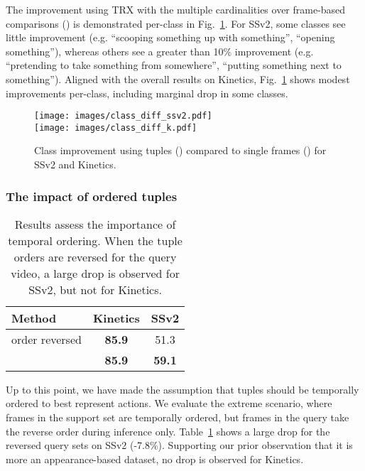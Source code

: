 \documentclass[final]{cvpr}
\begin{document}
The improvement using TRX with the multiple cardinalities  over frame-based comparisons () is demonstrated per-class in Fig.~\ref{fig:class_improvement_ss}.
For SSv2, some classes see little improvement (e.g. ``scooping something up with something'', ``opening something''), whereas others see a greater than 10\% improvement (e.g. ``pretending to take something from somewhere'', ``putting something next to something''). Aligned with the overall results on Kinetics, Fig.~\ref{fig:class_improvement_ss} shows modest improvements per-class, including marginal drop in some classes.


\begin{figure}[t]
\centering
\texttt{[image: images/class\_diff\_ssv2.pdf]}\\
\vspace{-2mm}
\texttt{[image: images/class\_diff\_k.pdf]}
\caption{Class improvement using tuples () compared to single frames () for SSv2 and Kinetics.\vspace{-8pt}}
\label{fig:class_improvement_ss}
\end{figure}


\vspace*{-8pt}
\subsubsection{The impact of ordered tuples}\label{sec:ablation_order}
\vspace*{-5pt}

\begin{table}
\small
\centering 
\begin{tabular}{lcc}
\toprule
Method                                            &   Kinetics    &   SSv2 \\ \midrule
 order reversed           &   {\bf 85.9}        & 51.3       \\
                                &  {\bf 85.9}        & {\bf 59.1}       \\
\bottomrule
\end{tabular}
\vspace{-5pt}
\caption{Results assess the importance of temporal ordering.  When the tuple orders are reversed for the query video, a large drop is observed for SSv2, but not for Kinetics.\vspace{-14pt}}
\label{tab:ordering}
\end{table}

Up to this point, we have made the assumption that tuples should be temporally ordered to best represent actions.  
We evaluate the extreme scenario, where frames in the support set are temporally ordered, but frames in the query take the reverse order during inference only. 
Table~\ref{tab:ordering} shows a large drop for the reversed query sets on SSv2 (-7.8\%). Supporting our prior observation that it is more an appearance-based dataset, no drop is observed for Kinetics.  
\end{document}
